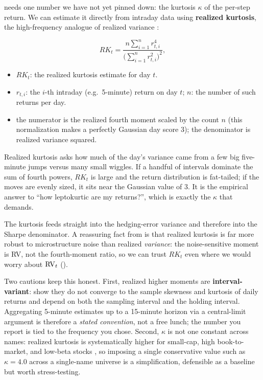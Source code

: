  needs one number we have not yet pinned down: the kurtosis $\kappa$ of the per-step return. We can estimate it directly from intraday data using \textbf{realized kurtosis}, the high-frequency analogue of realized variance \citep{AmayaEtAl2015}:

\begin{equation}
\label{eq:ivrv:realized-kurtosis}
RK_t = \frac{n\sum_{i=1}^{n} r_{t,i}^4}{\Big(\sum_{i=1}^{n} r_{t,i}^2\Big)^2},
\end{equation}
\begin{itemize}
  \item $RK_t$: the realized kurtosis estimate for day $t$.
  \item $r_{t,i}$: the $i$-th intraday (e.g.\ 5-minute) return on day $t$; $n$: the number of such returns per day.
  \item the numerator is the realized fourth moment scaled by the count $n$ (this normalization makes a perfectly Gaussian day score $3$); the denominator is realized variance squared.
\end{itemize}

\begin{intuition}
Realized kurtosis asks how much of the day's variance came from a few big five-minute jumps versus many small wiggles. If a handful of intervals dominate the sum of fourth powers, $RK_t$ is large and the return distribution is fat-tailed; if the moves are evenly sized, it sits near the Gaussian value of $3$. It is the empirical answer to ``how leptokurtic are my returns?'', which is exactly the $\kappa$ that  demands.
\end{intuition}

\begin{projectconnection}
The kurtosis feeds straight into the hedging-error variance and therefore into the Sharpe denominator. A reassuring fact from \citet{AmayaEtAl2015} is that realized kurtosis is far more robust to microstructure noise than realized \emph{variance}: the noise-sensitive moment is RV, not the fourth-moment ratio, so we can trust $RK_t$ even where we would worry about $\operatorname{RV}_t$ ().
\end{projectconnection}

Two cautions keep this honest. First, realized higher moments are \textbf{interval-variant}: \citet{AhadzieJeyasreedharan2020} show they do not converge to the sample skewness and kurtosis of daily returns and depend on both the sampling interval and the holding interval. Aggregating 5-minute estimates up to a 15-minute horizon via a central-limit argument is therefore a \emph{stated convention}, not a free lunch; the number you report is tied to the frequency you chose. Second, $\kappa$ is not one constant across names: realized kurtosis is systematically higher for small-cap, high book-to-market, and low-beta stocks \citep{AmayaEtAl2015}, so imposing a single conservative value such as $\kappa = 4.0$ across a single-name universe is a simplification, defensible as a baseline but worth stress-testing.

